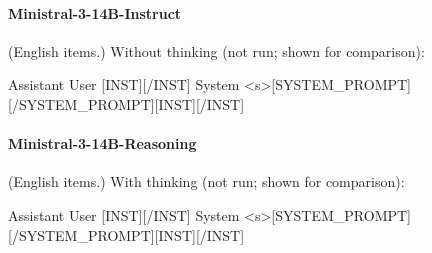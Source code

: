 \paragraph{Ministral-3-14B-Instruct} (English items.)
\noindent Without thinking (not run; shown for comparison):
\begin{Rendering}
Assistant  
User       [INST]\NL{}\NL{}[/INST]
System     <s>[SYSTEM_PROMPT][/SYSTEM_PROMPT][INST][/INST]
\end{Rendering}
\paragraph{Ministral-3-14B-Reasoning} (English items.)
\noindent With thinking (not run; shown for comparison):
\begin{Rendering}
Assistant  
User       [INST]\NL{}\NL{}[/INST]
System     <s>[SYSTEM_PROMPT][/SYSTEM_PROMPT][INST][/INST]
\end{Rendering}
